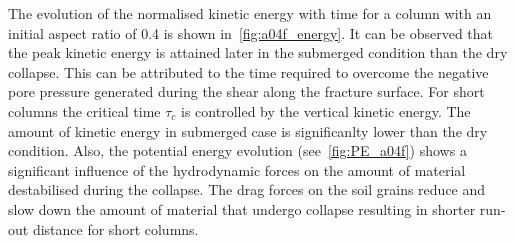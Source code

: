 The evolution of the normalised kinetic energy with time for a column with an 
initial aspect ratio of 0.4 is shown in~\cref{fig:a04f_energy}. It can be 
observed that the peak kinetic energy is attained later in the submerged 
condition than the dry collapse. This can be attributed to the time required to 
overcome the negative pore pressure generated during the shear along the 
fracture surface. For short columns the critical time $\tau_c$ is controlled by 
the vertical kinetic energy. The amount of kinetic energy in submerged case is 
significanlty lower than the dry condition. Also, the potential energy 
evolution (see~\cref{fig:PE_a04f}) shows a significant influence of the 
hydrodynamic forces on the amount of material destabilised during the collapse. 
The drag forces on the soil grains reduce and slow down the amount of material 
that undergo collapse resulting in shorter run-out distance for short columns. 
